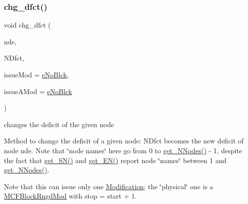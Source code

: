 \subsubsection{\texorpdfstring{chg\+\_\+dfct()}{chg\_dfct()}}
{\footnotesize\ttfamily void chg\+\_\+dfct (\begin{DoxyParamCaption}\item[{\mbox{\hyperlink{class_s_m_spp__di__unipi__it_1_1_m_c_f_block_aee6156e2ce80720d57a082d80f39d8cc}{c\+\_\+\+Index}}}]{nde,  }\item[{\mbox{\hyperlink{class_s_m_spp__di__unipi__it_1_1_m_c_f_block_a956c123a5a6b2b52f033ca1987acd80e}{c\+\_\+\+F\+Number}}}]{N\+Dfct,  }\item[{\mbox{\hyperlink{group___modification___t_y_p_e_s_ga544246d8c462e9a2d817c2c30797968f}{c\+\_\+\+Mod\+Param}}}]{issue\+Mod = {\ttfamily \mbox{\hyperlink{group___modification___t_y_p_e_s_gga48fddcdd03a03f49b7e389ca1ed938d4ada69e89c5f46e563d8a13cfa6830c136}{e\+No\+Blck}}},  }\item[{\mbox{\hyperlink{group___modification___t_y_p_e_s_ga544246d8c462e9a2d817c2c30797968f}{c\+\_\+\+Mod\+Param}}}]{issue\+A\+Mod = {\ttfamily \mbox{\hyperlink{group___modification___t_y_p_e_s_gga48fddcdd03a03f49b7e389ca1ed938d4ada69e89c5f46e563d8a13cfa6830c136}{e\+No\+Blck}}} }\end{DoxyParamCaption})}



changes the deficit of the given node 

Method to change the deficit of a given node\+: N\+Dfct becomes the new deficit of node nde. Note that \char`\"{}node names\char`\"{} here go from 0 to \mbox{\hyperlink{class_s_m_spp__di__unipi__it_1_1_m_c_f_block_afff9080606a5612d33ba20c39d663839}{get\+\_\+\+N\+Nodes()}} -\/ 1, despite the fact that \mbox{\hyperlink{class_s_m_spp__di__unipi__it_1_1_m_c_f_block_a48ce277b5dac05d54aa2281fa4595c7b}{get\+\_\+\+S\+N()}} and \mbox{\hyperlink{class_s_m_spp__di__unipi__it_1_1_m_c_f_block_a34619412f7c801aadfa0b083a6efda36}{get\+\_\+\+E\+N()}} report node \char`\"{}names\char`\"{} between 1 and \mbox{\hyperlink{class_s_m_spp__di__unipi__it_1_1_m_c_f_block_afff9080606a5612d33ba20c39d663839}{get\+\_\+\+N\+Nodes()}}.

Note that this can issue only one \mbox{\hyperlink{class_s_m_spp__di__unipi__it_1_1_modification}{Modification}}; the \char`\"{}physical\char`\"{} one is a \mbox{\hyperlink{class_s_m_spp__di__unipi__it_1_1_m_c_f_block_rngd_mod}{M\+C\+F\+Block\+Rngd\+Mod}} with stop = start + 1. \mbox{\label{class_s_m_spp__di__unipi__it_1_1_m_c_f_block_a1ac290b99c91ae5450dd0fa06301218e}} 
